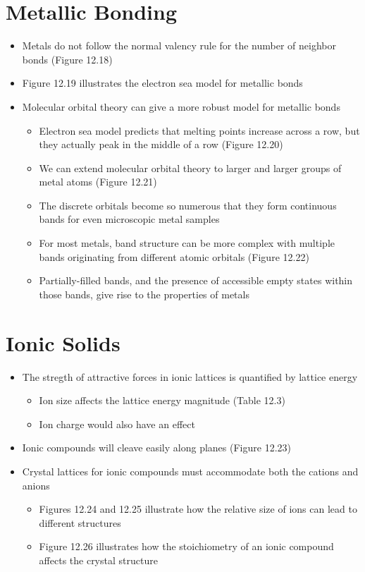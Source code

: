 \documentclass[12pt, openany, letterpaper]{memoir}
\begin{document}
\section{Metallic Bonding}
\begin{itemize}
  \item Metals do not follow the normal valency rule for the number of neighbor bonds (Figure 12.18)
  \item Figure 12.19 illustrates the electron sea model for metallic bonds
  \item Molecular orbital theory can give a more robust model for metallic bonds
  \begin{itemize}
    \item Electron sea model predicts that melting points increase across a row, but they actually peak in the middle of a row (Figure 12.20)
    \item We can extend molecular orbital theory to larger and larger groups of metal atoms (Figure 12.21)
    \item The discrete orbitals become so numerous that they form continuous bands for even microscopic metal samples
    \item For most metals, band structure can be more complex with multiple bands originating from different atomic orbitals (Figure 12.22)
    \item Partially-filled bands, and the presence of accessible empty states within those bands, give rise to the properties of metals
  \end{itemize}
\end{itemize}

\section{Ionic Solids}
\begin{itemize}
  \item The stregth of attractive forces in ionic lattices is quantified by lattice energy
  \begin{itemize}
    \item Ion size affects the lattice energy magnitude (Table 12.3)
    \item Ion charge would also have an effect
  \end{itemize}
  \item Ionic compounds will cleave easily along planes (Figure 12.23)
  \item Crystal lattices for ionic compounds must accommodate both the cations and anions
  \begin{itemize}
    \item Figures 12.24 and 12.25 illustrate how the relative size of ions can lead to different structures
    \item Figure 12.26 illustrates how the stoichiometry of an ionic compound affects the crystal structure
  \end{itemize}
\end{itemize}
\end{document}
